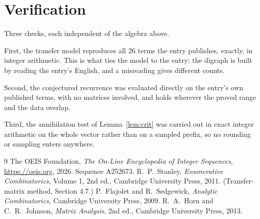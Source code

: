 \documentclass[11pt,a4paper]{article}
\theoremstyle{plain}
\theoremstyle{definition}
\begin{document}
\section{Verification}

Three checks, each independent of the algebra above.

First, the transfer model reproduces all $26$ terms the entry publishes, exactly, in
integer arithmetic. This is what ties the model to the entry: the digraph is built by reading
the entry's English, and a misreading gives different counts.

Second, the conjectured recurrence was evaluated directly on the entry's own published terms,
with no matrices involved, and holds wherever the proved range and the data overlap.

Third, the annihilation test of Lemma~\ref{lem:crit} was carried out in exact integer
arithmetic on the whole vector rather than on a sampled prefix, so no rounding or sampling
enters anywhere.

\begin{thebibliography}{9}
 The OEIS Foundation, \emph{The On-Line Encyclopedia of Integer
Sequences}, \url{https://oeis.org}, 2026. Sequence A252673.
 R.~P.~Stanley, \emph{Enumerative Combinatorics}, Volume 1, 2nd ed.,
Cambridge University Press, 2011. (Transfer-matrix method, Section 4.7.)
 P.~Flajolet and R.~Sedgewick, \emph{Analytic Combinatorics}, Cambridge
University Press, 2009.
 R.~A.~Horn and C.~R.~Johnson, \emph{Matrix Analysis}, 2nd ed., Cambridge
University Press, 2013.
\end{thebibliography}
\end{document}
